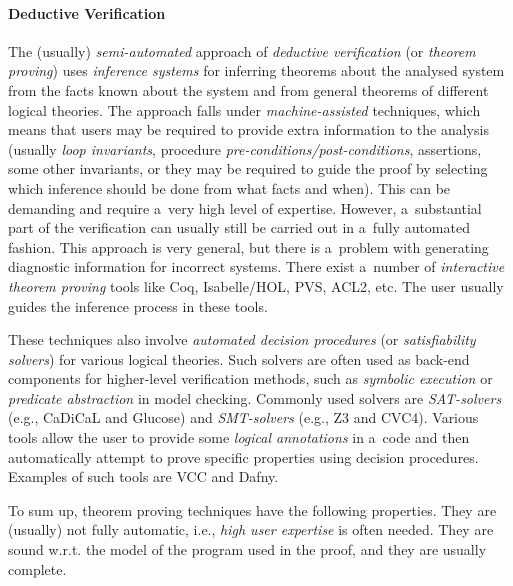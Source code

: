 \paragraph{Deductive Verification}
The (usually) \emph{semi-automated} approach of \emph{deductive verification} (or \emph{theorem proving}) uses \emph{inference systems} for inferring theorems about the analysed system from the facts known about the system and from general theorems of different logical theories. The approach falls under \emph{machine-assisted} techniques, which means that users may be required to provide extra information to the analysis (usually \emph{loop invariants}, procedure \emph{pre-conditions/post-conditions}, assertions, some other invariants, or they may be required to guide the proof by selecting which inference should be done from what facts and when). This can be demanding and require a~very high level of expertise. However, a~substantial part of the verification can usually still be carried out in a~fully automated fashion. This approach is very general, but there is a~problem with generating diagnostic information for incorrect systems. There exist a~number of \emph{interactive theorem proving} tools like Coq, Isabelle/HOL, PVS, ACL2, etc. The user usually guides the inference process in these tools.

These techniques also involve \emph{automated decision procedures} (or \emph{satisfiability solvers}) for various logical theories. Such solvers are often used as back-end components for higher-level verification methods, such as \emph{symbolic execution} or \emph{predicate abstraction} in model checking. Commonly used solvers are \emph{SAT-solvers} (e.g., CaDiCaL and Glucose) and \emph{SMT-solvers} (e.g., Z3 and CVC4). Various tools allow the user to provide some \emph{logical annotations} in a~code and then automatically attempt to prove specific properties using decision procedures. Examples of such tools are VCC and Dafny.

To sum up, theorem proving techniques have the following properties. They are (usually) not fully automatic, i.e., \emph{high user expertise} is often needed. They are sound w.r.t. the model of the program used in the proof, and they are usually complete.

